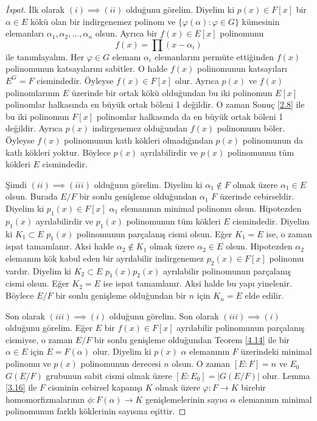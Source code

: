 \documentclass{article}
\theoremstyle{definition}
\theoremstyle{remark}
\newcommand{\envert}[1]{\left\lvert#1\right\rvert}
\let\abs=\envert
\begin{document}
    		\begin{proof}[İspat]
    	        İlk olarak $(i) \implies (ii)$ olduğunu görelim. Diyelim ki $p(x) \in F[x]$ bir $\alpha \in E$ kökü olan bir indirgenemez polinom ve $\{\varphi(\alpha) : \varphi \in G\}$ kümesinin elemanları $\alpha_1, \alpha_2, \dots, \alpha_n$ olsun. Ayrıca bir $f(x) \in E[x]$ polinomunu
    	        \begin{equation*}
    	            f(x) = \prod{(x - \alpha_i)}
    	        \end{equation*}
    	        ile tanımlayalım. Her $\varphi \in G$ elemanı $\alpha_i$ elemanlarını permüte ettiğinden $f(x)$ polinomunun katsayılarını sabitler. O halde $f(x)$ polinomunun katsayıları $E^G = F$ cismindedir. Öyleyse $f(x) \in F[x]$ olur. Ayrıca $p(x)$ ve $f(x)$ polinomlarının $E$ üzerinde bir ortak kökü olduğundan bu iki polinomun $E[x]$ polinomlar halkasında en büyük ortak böleni 1 değildir. O zaman Sonuç \ref{2.8} ile bu iki polinomun $F[x]$ polinomlar halkasında da en büyük ortak böleni 1 değildir. Ayrıca $p(x)$ indirgenemez olduğundan $f(x)$ polinomunu böler. Öyleyse $f(x)$ polinomunun katlı kökleri olmadığından $p(x)$ polinomunun da katlı kökleri yoktur. Böylece $p(x)$ ayrılabilirdir ve $p(x)$ polinomunun tüm kökleri $E$ cismindedir.\par
    	        Şimdi $(ii) \implies (iii)$ olduğunu görelim. Diyelim ki $\alpha_1 \notin F$ olmak üzere $\alpha_1 \in E$ olsun. Burada $E/F$ bir sonlu genişleme olduğundan $\alpha_1$ $F$ üzerinde cebirseldir. Diyelim ki $p_1(x) \in F[x]$ $\alpha_1$ elemanının minimal polinomu olsun. Hipotezden $p_1(x)$ ayrılabilirdir ve $p_1(x)$ polinomunun tüm kökleri $E$ cismindedir. Diyelim ki $K_1 \subset E$ $p_1(x)$ polinomunun parçalanış cismi olsun. Eğer $K_1 = E$ ise, o zaman ispat tamamlanır. Aksi halde $\alpha_2 \notin K_1$ olmak üzere $\alpha_2 \in E$ olsun. Hipotezden $\alpha_2$ elemanını kök kabul eden bir ayrılabilir indirgenemez $p_2(x) \in F[x]$ polinomu vardır. Diyelim ki $K_2 \subset E$ $p_1(x)p_2(x)$ ayrılabilir polinomunun parçalanış cismi olsun. Eğer $K_2 = E$ ise ispat tamamlanır. Aksi halde bu yapı yinelenir. Böylece $E/F$ bir sonlu genişleme olduğundan bir $n$ için $K_n = E$ elde edilir.\par
    	        Son olarak $(iii) \implies (i)$ olduğunu görelim. Son olarak $(iii) \implies (i)$ olduğunu görelim. Eğer $E$ bir $f(x) \in F[x]$ ayrılabilir polinomunun parçalanış cismiyse, o zaman $E/F$ bir sonlu genişleme olduğundan Teorem \ref{4.14} ile bir $\alpha \in E$ için $E = F(\alpha)$ olur. Diyelim ki $p(x)$ $\alpha$ elemanının $F$ üzerindeki minimal polinomu ve $p(x)$ polinomunun derecesi $n$ olsun. O zaman $[E : F] = n$ ve $E_0$ $G(E/F)$ grubunun sabit cismi olmak üzere $[E : E_0] = \abs{G(E/F)}$ olur. Lemma \ref{3.16} ile $F$ cisminin cebirsel kapanışı $K$ olmak üzere $\varphi: F \to K$ birebir homomorfizmalarının $\phi: F(\alpha) \to K$ genişlemelerinin sayısı $\alpha$ elemanının minimal polinomunun farklı köklerinin sayısına eşittir.
    	    \end{proof}
    	    
\end{document}
